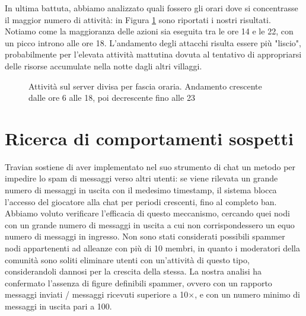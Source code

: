 In ultima battuta, abbiamo analizzato quali fossero gli orari dove si concentrasse il maggior numero di attività: in Figura \ref{fig:activity_players} sono riportati i nostri risultati. Notiamo come la maggioranza delle azioni sia eseguita tra le ore 14 e le 22, con un picco introno alle ore 18. L'andamento degli attacchi risulta essere più "liscio", probabilmente per l'elevata attività mattutina dovuta al tentativo di appropriarsi delle risorse accumulate nella notte dagli altri villaggi.\\
\begin{figure}
	\hfill
	\caption{Attività sul server divisa per fascia oraria. Andamento crescente dalle ore 6 alle 18, poi decrescente fino alle 23}
	\label{fig:activity_players}
\end{figure}


\section{Ricerca di comportamenti sospetti}
Travian sostiene di aver implementato nel suo strumento di chat un metodo per impedire lo spam di messaggi verso altri utenti: se viene rilevata un grande numero di messaggi in uscita con il medesimo timestamp, il sistema blocca l'accesso del giocatore alla chat per periodi crescenti, fino al completo ban.\\
Abbiamo voluto verificare l'efficacia di questo meccanismo, cercando quei nodi con un grande numero di messaggi in uscita a cui non corrispondessero un equo numero di messaggi in ingresso.
Non sono stati considerati possibili spammer nodi appartenenti ad alleanze con più di 10 membri, in quanto i moderatori della comunità sono soliti eliminare utenti con un'attività di questo tipo, considerandoli dannosi per la crescita della stessa.
La nostra analisi ha confermato l'assenza di figure definibili spammer, ovvero con un rapporto messaggi inviati / messaggi ricevuti superiore a 10$\times$, e con un numero minimo di messaggi in uscita pari a 100.


